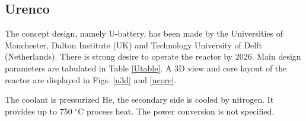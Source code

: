 \pagebreak
\subsection{Urenco}
The concept design, namely U-battery, has been made by the Universities of Manchester, Dalton Institute (UK) and Technology University of Delft (Netherlands). There is strong desire to operate the reactor by 2026. Main design parameters \cite{ding_design_2011} are tabulated in Table \ref{Utable}. A 3D view and core layout of the reactor are displayed in Figs. \ref{u3d} and \ref{ucore}. 

The coolant is pressurized He, the secondary side is cooled by nitrogen. It provides up to 750 $^\circ{}$C process heat. The power conversion is not specified.

\begin{table} [htbp]
\begin{center}


\end{center}
\end{table}
